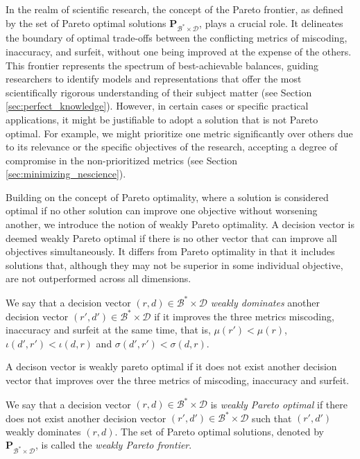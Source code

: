 In the realm of scientific research, the concept of the Pareto frontier, as defined by the set of Pareto optimal solutions $\mathbf{P}_{\mathcal{B}^\ast \times \mathcal{D}}$, plays a crucial role. It delineates the boundary of optimal trade-offs between the conflicting metrics of miscoding, inaccuracy, and surfeit, without one being improved at the expense of the others. This frontier represents the spectrum of best-achievable balances, guiding researchers to identify models and representations that offer the most scientifically rigorous understanding of their subject matter (see Section \ref{sec:perfect_knowledge}). However, in certain cases or specific practical applications, it might be justifiable to adopt a solution that is not Pareto optimal. For example, we might prioritize one metric significantly over others due to its relevance or the specific objectives of the research, accepting a degree of compromise in the non-prioritized metrics (see Section \ref{sec:minimizing_nescience}).

Building on the concept of Pareto optimality, where a solution is considered optimal if no other solution can improve one objective without worsening another, we introduce the notion of weakly Pareto optimality. A decision vector is deemed weakly Pareto optimal if there is no other vector that can improve all objectives simultaneously. It differs from Pareto optimality in that it includes solutions that, although they may not be superior in some individual objective, are not outperformed across all dimensions.

\begin{definition}
We say that a decision vector $(r, d) \in \mathcal{B}^\ast \times \mathcal{D}$ \emph{weakly dominates} another decision vector $(r', d') \in \mathcal{B}^\ast \times \mathcal{D}$ if it improves the three metrics miscoding, inaccuracy and surfeit at the same time, that is, $\mu(r') < \mu(r)$, $\iota(d', r') < \iota(d, r)$ and $\sigma(d', r') < \sigma(d, r)$.
\end{definition}

A decison vector is weakly pareto optimal if it does not exist another decision vector that improves over the three metrics of miscoding, inaccuracy and surfeit.

\begin{definition}
We say that a decision vector $(r, d) \in \mathcal{B}^\ast \times \mathcal{D}$ is \emph{weakly Pareto optimal} if there does not exist another decision vector $(r', d') \in \mathcal{B}^\ast \times \mathcal{D}$ such that $(r', d')$ weakly dominates $(r, d)$. The set of Pareto optimal solutions, denoted by $\mathbf{P}_{\mathcal{B}^\ast \times \mathcal{D}}$, is called the \emph{weakly Pareto frontier}.
\end{definition}

